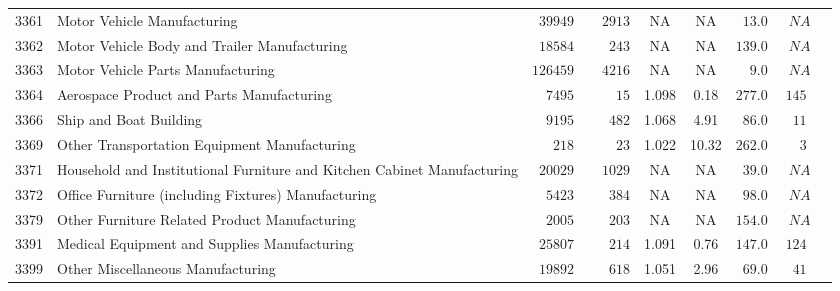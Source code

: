 \documentclass[9pt, oneside]{article}   	%
\begin{document}
\begin{longtable}{lp{3 in}ccccccc}
3361  & Motor Vehicle Manufacturing & $\phantom{0}39949$ & $\phantom{00}2913$ &    NA &    NA & $\phantom{0}13.0$ & $\phantom{0}NA$ \\
3362  & Motor Vehicle Body and Trailer Manufacturing & $\phantom{0}18584$ & $\phantom{000}243$ &    NA &    NA & $139.0$ & $\phantom{0}NA$ \\
3363  & Motor Vehicle Parts Manufacturing & $126459$ & $\phantom{00}4216$ &    NA &    NA & $\phantom{00}9.0$ & $\phantom{0}NA$ \\
3364  & Aerospace Product and Parts Manufacturing & $\phantom{00}7495$ & $\phantom{0000}15$ & 1.098 &  0.18 & $277.0$ & $145$ \\
3366  & Ship and Boat Building & $\phantom{00}9195$ & $\phantom{000}482$ & 1.068 &  4.91 & $\phantom{0}86.0$ & $\phantom{0}11$ \\
3369  & Other Transportation Equipment Manufacturing & $\phantom{000}218$ & $\phantom{0000}23$ & 1.022 & 10.32 & $262.0$ & $\phantom{00}3$ \\
3371  & Household and Institutional Furniture and Kitchen Cabinet Manufacturing & $\phantom{0}20029$ & $\phantom{00}1029$ &    NA &    NA & $\phantom{0}39.0$ & $\phantom{0}NA$ \\
3372  & Office Furniture (including Fixtures) Manufacturing & $\phantom{00}5423$ & $\phantom{000}384$ &    NA &    NA & $\phantom{0}98.0$ & $\phantom{0}NA$ \\
3379  & Other Furniture Related Product Manufacturing & $\phantom{00}2005$ & $\phantom{000}203$ &    NA &    NA & $154.0$ & $\phantom{0}NA$ \\
3391  & Medical Equipment and Supplies Manufacturing & $\phantom{0}25807$ & $\phantom{000}214$ & 1.091 &  0.76 & $147.0$ & $124$ \\
3399  & Other Miscellaneous Manufacturing & $\phantom{0}19892$ & $\phantom{000}618$ & 1.051 &  2.96 & $\phantom{0}69.0$ & $\phantom{0}41$ \\


\end{longtable}
\end{document}
